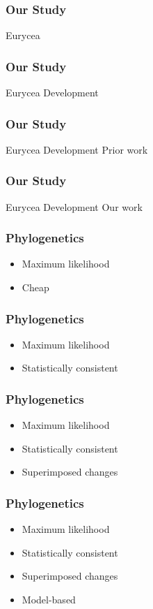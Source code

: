 \documentclass{beamer}
\begin{document}
\begin{frame}
\frametitle{Our Study}
Eurycea
\end{frame}

\begin{frame}
\frametitle{Our Study}
Eurycea
Development
\end{frame}

\begin{frame}
\frametitle{Our Study}
Eurycea
Development
Prior work
\end{frame}

\begin{frame}
\frametitle{Our Study}
Eurycea
Development
Our work
\end{frame}

\begin{frame}
\frametitle{Phylogenetics}
\begin{itemize}
\item Maximum likelihood
\item Cheap
\end{itemize}
\end{frame}

\begin{frame}
\frametitle{Phylogenetics}
\begin{itemize}
\item Maximum likelihood
\item Statistically consistent
\end{itemize}
\end{frame}

\begin{frame}
\frametitle{Phylogenetics}
\begin{itemize}
\item Maximum likelihood
\item Statistically consistent
\item Superimposed changes
\end{itemize}
\end{frame}

\begin{frame}
\frametitle{Phylogenetics}
\begin{itemize}
\item Maximum likelihood
\item Statistically consistent
\item Superimposed changes
\item Model-based 
\end{itemize}
\end{frame}
\end{document}
